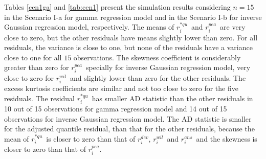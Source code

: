 \documentclass[11pt,authoryear,review,3p,times]{elsarticle}
\newcommand{\dev}{$r_i^{dev}$}
\newcommand{\pea}{$r_i^{pea}$}
\newcommand{\wil}{$r_i^{wil}$}
\newcommand{\aasc}{$r_i^{ans}$}
\newcommand{\aqu}{$r_i^{*qu}$}
\begin{document}
 
Tables \ref{cen1ga} and \ref{tab:cen1} present the simulation results considering $n=15$ in the Scenario I-a for gamma regression model and in the Scenario I-b for inverse Gaussian regression model, respectively.     
 The means of \aqu\, and \pea\ are very close to zero, but the other residuals have means slightly lower than zero. 
 For all residuals, the variance is close to one, but none of the residuals have a variance close to one for all $15$ observations.
 The skewness coefficient is considerably greater than zero for \pea\ specially for inverse Gaussian regression model, very close to zero for  \wil\ and slightly lower than zero for the other residuals. 
 The excess kurtosis coefficients are similar and not too close to zero for the five residuals. 
 The residual \aqu\, has smaller AD statistic than the other residuals in 10 out of 15 observations for gamma regression model and 14 out of 15 observations for inverse Gaussian regression model.
 The AD statistic is smaller for the adjusted quantile residual, than that for the other residuals, because the mean of \aqu\, is closer to zero than that of \dev, \wil\, and \aasc\, and the skewness is closer to zero than that of \pea. 
\end{document}
